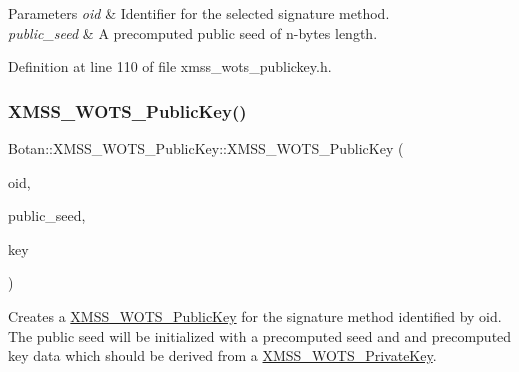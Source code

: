 \begin{DoxyParams}{Parameters}
{\em oid} & Identifier for the selected signature method. \\
\hline
{\em public\+\_\+seed} & A precomputed public seed of n-\/bytes length. \\
\hline
\end{DoxyParams}


Definition at line 110 of file xmss\+\_\+wots\+\_\+publickey.\+h.

\mbox{\label{class_botan_1_1_x_m_s_s___w_o_t_s___public_key_a107a21510470543ddb752834e8f08594}} 
\subsubsection{\texorpdfstring{X\+M\+S\+S\+\_\+\+W\+O\+T\+S\+\_\+\+Public\+Key()}{XMSS\_WOTS\_PublicKey()}\hspace{0.1cm}{\footnotesize\ttfamily [4/6]}}
{\footnotesize\ttfamily Botan\+::\+X\+M\+S\+S\+\_\+\+W\+O\+T\+S\+\_\+\+Public\+Key\+::\+X\+M\+S\+S\+\_\+\+W\+O\+T\+S\+\_\+\+Public\+Key (\begin{DoxyParamCaption}\item[{X\+M\+S\+S\+\_\+\+W\+O\+T\+S\+\_\+\+Parameters\+::ots\+\_\+algorithm\+\_\+t}]{oid,  }\item[{secure\+\_\+vector$<$ uint8\+\_\+t $>$ \&\&}]{public\+\_\+seed,  }\item[{wots\+\_\+keysig\+\_\+t \&\&}]{key }\end{DoxyParamCaption})\hspace{0.3cm}{\ttfamily [inline]}}

Creates a \mbox{\hyperlink{class_botan_1_1_x_m_s_s___w_o_t_s___public_key}{X\+M\+S\+S\+\_\+\+W\+O\+T\+S\+\_\+\+Public\+Key}} for the signature method identified by oid. The public seed will be initialized with a precomputed seed and and precomputed key data which should be derived from a \mbox{\hyperlink{class_botan_1_1_x_m_s_s___w_o_t_s___private_key}{X\+M\+S\+S\+\_\+\+W\+O\+T\+S\+\_\+\+Private\+Key}}.


